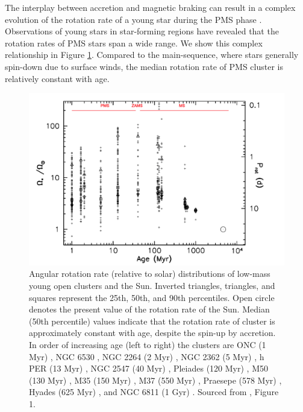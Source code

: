 The interplay between accretion and magnetic braking can result in a complex evolution of the rotation rate of a young star during the PMS phase \citep{gallet_improved_2013}.
Observations of young stars in star-forming regions have revealed that the rotation rates of PMS stars span a wide range.
We show this complex relationship in Figure \ref{fig:pms_ms_evo}.
Compared to the main-sequence, where stars generally spin-down due to surface winds, the median rotation rate of PMS cluster is relatively constant with age.

\begin{figure}
    \includegraphics[width=\textwidth]{Figures/intro_figures/pms_evo.png}
    \caption[Angular rotation rate distributions of low-mass young open clusters and the Sun over time.]{Angular rotation rate (relative to solar) distributions of low-mass young open clusters and the Sun. Inverted triangles, triangles, and squares represent the 25th, 50th, and 90th percentiles. Open circle denotes the present value of the rotation rate of the Sun. Median (50th percentile) values indicate that the rotation rate of cluster is approximately constant with age, despite the spin-up by accretion. In order of increasing age (left to right) the clusters are ONC (1 Myr) \citep{herbst_stellar_2002}, NGC 6530 \citep{henderson_time-series_2012}, NGC 2264 (2 Myr) \citep{affer_rotation_2013}, NGC 2362 (5 Myr) \citep{irwin_monitor_2008}, h PER (13 Myr) \citep{moraux_monitor_2013}, NGC 2547 (40 Myr) \citep{irwin_monitor_2008}, Pleiades (120 Myr) \citep{hartman_large_2010}, M50 (130 Myr) \citep{irwin_monitor_2009}, M35 (150 Myr) \citep{meibom_slar_2009}, M37 (550 Myr) \citep{hartman_deep_2009}, Praesepe (578 Myr) \citep{delorme_stellar_2011}, Hyades (625 Myr) \citep{delorme_stellar_2011}, and NGC 6811 (1 Gyr) \citep{meibom_kepler_2011}.  Sourced from \citet{gallet_improved_2013},  Figure 1.}
    \label{fig:pms_ms_evo}
\end{figure}


